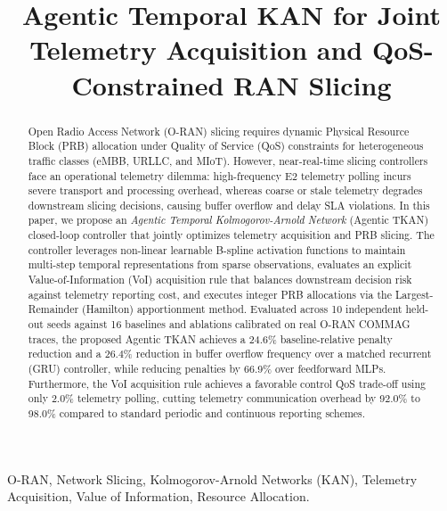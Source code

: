 \documentclass[conference]{IEEEtran}
\begin{document}
\title{Agentic Temporal KAN for Joint Telemetry Acquisition and QoS-Constrained RAN Slicing}

\author{
}

\maketitle

\begin{abstract}
Open Radio Access Network (O-RAN) slicing requires dynamic Physical Resource Block (PRB) allocation under Quality of Service (QoS) constraints for heterogeneous traffic classes (eMBB, URLLC, and MIoT). However, near-real-time slicing controllers face an operational telemetry dilemma: high-frequency E2 telemetry polling incurs severe transport and processing overhead, whereas coarse or stale telemetry degrades downstream slicing decisions, causing buffer overflow and delay SLA violations. In this paper, we propose an \textit{Agentic Temporal Kolmogorov-Arnold Network} (Agentic TKAN) closed-loop controller that jointly optimizes telemetry acquisition and PRB slicing. The controller leverages non-linear learnable B-spline activation functions to maintain multi-step temporal representations from sparse observations, evaluates an explicit Value-of-Information (VoI) acquisition rule that balances downstream decision risk against telemetry reporting cost, and executes integer PRB allocations via the Largest-Remainder (Hamilton) apportionment method. Evaluated across 10 independent held-out seeds against 16 baselines and ablations calibrated on real O-RAN COMMAG traces, the proposed Agentic TKAN achieves a 24.6\% baseline-relative penalty reduction and a 26.4\% reduction in buffer overflow frequency over a matched recurrent (GRU) controller, while reducing penalties by 66.9\% over feedforward MLPs. Furthermore, the VoI acquisition rule achieves a favorable control QoS trade-off using only 2.0\% telemetry polling, cutting telemetry communication overhead by 92.0\% to 98.0\% compared to standard periodic and continuous reporting schemes.
\end{abstract}

\begin{IEEEkeywords}
O-RAN, Network Slicing, Kolmogorov-Arnold Networks (KAN), Telemetry Acquisition, Value of Information, Resource Allocation.
\end{IEEEkeywords}
\end{document}
